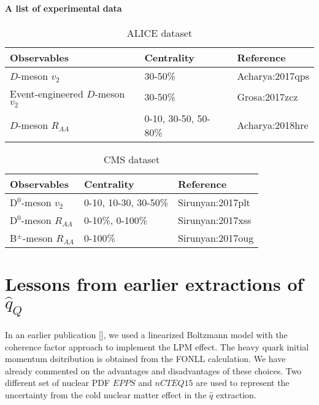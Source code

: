 \paragraph{A list of experimental data}
\begin{center}
\begin{table}[h]
\caption{ALICE dataset}\label{table:ALICE-obs} 
\begin{tabularx}{\columnwidth}{XXX}
\hline 
 Observables & Centrality & Reference\\ 
\hline 
$D$-meson $v_2$ & 30-50\% & {Acharya:2017qps}\\ 
\hline 
Event-engineered $D$-meson $v_2$ & 30-50\% & {Grosa:2017zcz}\\ 
\hline 
$D$-meson $R_{AA}$ & 0-10, 30-50, 50-80\% & {Acharya:2018hre}\\
\hline 
\end{tabularx}
\end{table}
\begin{table}[h]
\caption{CMS dataset}\label{table:CMS-obs} 
\begin{tabularx}{\columnwidth}{XXX}
\hline 
Observables & Centrality & Reference\\ 
\hline 
D${}^0$-meson $v_2$ & 0-10, 10-30, 30-50\% & {Sirunyan:2017plt}\\ 
\hline 
D${}^0$-meson $R_{AA}$ & 0-10\%, 0-100\% & {Sirunyan:2017xss}\\ 
\hline 
B${}^{\pm}$-meson $R_{AA}$ & 0-100\% & {Sirunyan:2017oug}\\ 
\hline 
\end{tabularx}
\end{table}
\end{center}

\section{Lessons from earlier extractions of $\hat{q}_Q$}
In an earlier publication [], we used a linearized Boltzmann model with the coherence factor approach to implement the LPM effect.
The heavy quark initial momentum dsitribution is obtained from the FONLL calculation.
We have already commented on the advantages and disadvantages of these choices.
Two different set of nuclear PDF $EPPS$ and $nCTEQ15$ are used to represent the uncertainty from the cold nuclear matter effect in the $\hat{q}$ extraction.

